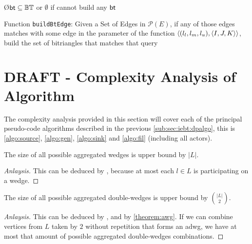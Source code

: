\begin{algorithm}[h!]
\SetAlgoRefName{[A10]}
\O{$\mathsf{bt} \subseteq \mathbb{BT}$ or $\emptyset$ if cannot build any $\mathsf{bt}$}
\caption[Function \texttt{buildBtEdge}]{Function \texttt{buildBtEdge}: Given a Set of Edges in $\mathcal{P}(E)$, if any of those edges matches with some edge in the parameter of the function $\left\langle (l_l, l_m, l_u), \left\langle I,J,K \right\rangle \right\rangle$, build the set of bitriangles that matches that query}
\label{algo:buildBtEdge}
\end{algorithm}

\iffalse
\clearpage
\section{DRAFT - Complexity Analysis of Algorithm}
The complexity analysis provided in this section will cover each of the principal pseudo-code algorithms described in the previous \autoref{sub:sec:iebt:dpalgo}, this is \autoref{algo:source}, \autoref{algo:gen}, \autoref{algo:sink} and \autoref{algo:fil} (including all actors). 

\begin{theorem}[$|\aw| \leq |L|$]\label{theorem:awg}
The size of all possible aggregated wedges is upper bound by $|L|$.
\end{theorem}
\begin{proof}[Anlaysis]
This can be deduced by , because at most each $l \in L$ is participating on a wedge.
\end{proof}

\begin{theorem}\label{theorem:adwg}
The size of all possible aggregated double-wedges is upper bound by $\binom{|L|}{2}$.
\end{theorem}
\begin{proof}[Anlaysis]
This can be deduced by , and by \autoref{theorem:awg}. If we can combine vertices from $L$ taken by $2$ without repetition that forms an \acrshort{adwg}, we have at most that amount of possible aggregated double-wedges combinations.
\end{proof}
      
